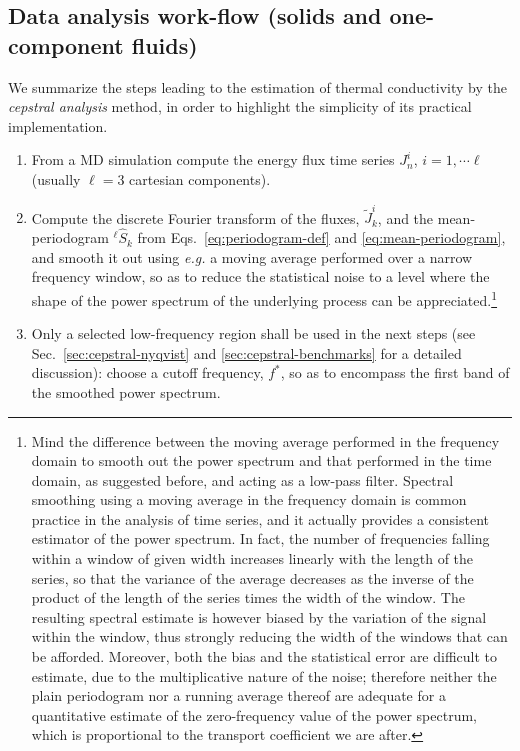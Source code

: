 \subsection{Data analysis work-flow (solids and one-component fluids)}  \label{sec:cepstral-workflow-1comp}
We summarize the steps leading to the estimation of thermal conductivity by the \textit{cepstral analysis} method, in order to highlight the simplicity of its practical implementation.
\begin{enumerate}
    \item From a MD simulation compute the energy flux time series $J_n^i$, $i=1,\cdots\ell$ (usually $\ell=3$ cartesian components).
    \item Compute the discrete Fourier transform of the fluxes, $\tilde{J}_k^i$, and the mean-periodogram $^{\ell\!}\hat{S}_k$ from Eqs.~\eqref{eq:periodogram-def} and \eqref{eq:mean-periodogram}, and smooth it out using \emph{e.g.} a moving average \cite{MovingAverage} performed over a narrow frequency window, so as to reduce the statistical noise to a level where the shape of the power spectrum of the underlying process can be appreciated.\footnote{Mind the difference between the moving average performed in the frequency domain to smooth out the power spectrum and that performed in the time domain, as suggested before, and acting as a low-pass filter. Spectral smoothing using a moving average in the frequency domain is common practice in the analysis of time series, and it actually provides a consistent estimator of the power spectrum. In fact, the number of frequencies falling within a window of given width increases linearly with the length of the series, so that the variance of the average decreases as the inverse of the product of the length of the series times the width of the window. The resulting spectral estimate is however biased by the variation of the signal within the window, thus strongly reducing the width of the windows that can be afforded. Moreover, both the bias and the statistical error are difficult to estimate, due to the multiplicative nature of the noise; therefore neither the plain periodogram nor a running average thereof are adequate for a quantitative estimate of the zero-frequency value of the power spectrum, which is proportional to the transport coefficient we are after.}
    \item Only a selected low-frequency region shall be used in the next steps (see Sec.~\ref{sec:cepstral-nyqvist} and \ref{sec:cepstral-benchmarks} for a detailed discussion): choose a cutoff frequency, $f^*$, so as to encompass the first band of the smoothed power spectrum. 

\end{enumerate}
